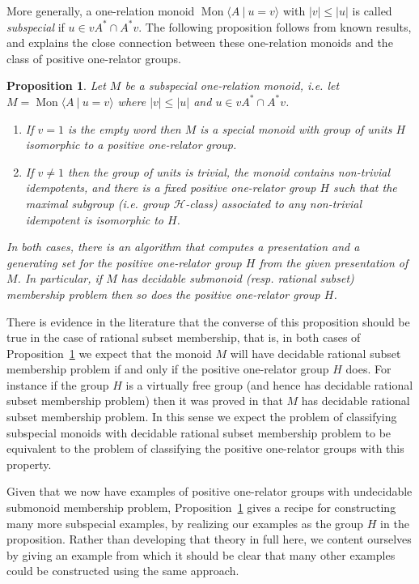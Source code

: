 \documentclass{amsart}
\newcommand{\Mpres}[2]{\operatorname{Mon}\bigl\langle #1\:|\:#2 \bigr\rangle}
\theoremstyle{plain}
\newtheorem{prop}[theorem]{Proposition}
\theoremstyle{definition}
\begin{document}
More generally, a one-relation monoid $\Mpres{A}{u=v}$ with $|v| \leq |u|$ is called \textit{subspecial} if $u \in vA^* \cap A^*v$. The following proposition follows from known results, and explains the close connection between these one-relation monoids and the class of positive one-relator groups. 

\begin{prop}\label{prop_subspecial}  
Let $M$ be a subspecial one-relation monoid, i.e. let $M=\Mpres{A}{u=v}$ where $|v| \leq |u|$ and $u \in vA^* \cap A^*v$. 
\begin{enumerate} 
\item[(i)] If $v=1$ is the empty word then $M$ is a special monoid with group of units $H$ isomorphic to a positive one-relator group. 
\item[(ii)] If $v \neq 1$ then the group of units is trivial, the monoid contains non-trivial idempotents, and there is a fixed positive one-relator group $H$ such that the maximal subgroup (i.e. group $\mathscr{H}$-class) associated to any non-trivial idempotent is isomorphic to $H$. 
  \end{enumerate}
In both cases, there is an algorithm that computes a presentation and a generating set for the positive one-relator group $H$ from the given presentation of $M$. In particular, if $M$ has decidable submonoid (resp. rational subset) membership problem then so does the positive one-relator group $H$.   
\end{prop}


There is evidence in the literature that the converse of this proposition should be true in the case of rational subset membership, that is, in both cases of Proposition~\ref{prop_subspecial} we expect that the monoid $M$ will have decidable rational subset membership problem if and only if the positive one-relator group $H$ does. For instance if the group $H$ is a virtually free group (and hence has decidable rational subset membership problem) then it was proved in \cite{NybergBrodda2022a, nybergbroddacompression} that $M$ has decidable rational subset membership problem. In this sense we expect the problem of classifying subspecial monoids with decidable rational subset membership problem to be equivalent to the problem of classifying the positive one-relator groups with this property. 

Given that we now have examples of positive one-relator groups with undecidable submonoid membership problem, Proposition~\ref{prop_subspecial} gives a recipe for constructing many more subspecial examples, by realizing our examples as the group $H$ in the proposition.  Rather than developing that theory in full here, we content ourselves by giving an example from which it should be clear that many other examples could be constructed using the same approach.
  
\end{document}
